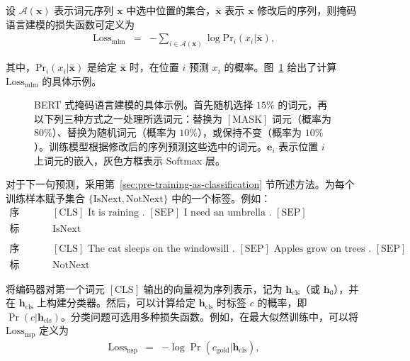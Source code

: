 设 $\mathcal{A}(\mathbf{x})$ 表示词元序列 $\mathbf{x}$ 中选中位置的集合，$\bar{\mathbf{x}}$ 表示 $\mathbf{x}$ 修改后的序列，则掩码语言建模的损失函数可定义为
\begin{eqnarray}
\mathrm{Loss}_{\mathrm{mlm}} & = & - \sum_{i \in \mathcal{A}(\mathbf{x})} \log \mathrm{Pr}_i(x_i|\bar{\mathbf{x}}),
\end{eqnarray}

\noindent 其中，$\mathrm{Pr}_i(x_i|\bar{\mathbf{x}})$ 是给定 $\bar{\mathbf{x}}$ 时，在位置 $i$ 预测 $x_i$ 的概率。图~\ref{fig:example-bert-mlm-loss} 给出了计算 $\mathrm{Loss}_{\mathrm{mlm}}$ 的具体示例。

\begin{figure}[!t]
\centering

\caption{BERT 式掩码语言建模的具体示例。首先随机选择 $15\%$ 的词元，再以下列三种方式之一处理所选词元：替换为 $\mathrm{[MASK]}$ 词元（概率为 $80\%$）、替换为随机词元（概率为 $10\%$），或保持不变（概率为 $10\%$）。训练模型根据修改后的序列预测这些选中的词元。$\mathbf{e}_i$ 表示位置 $i$ 上词元的嵌入，灰色方框表示 Softmax 层。}
\label{fig:example-bert-mlm-loss}
\end{figure}

对于下一句预测，采用第~\ref{sec:pre-training-as-classification} 节所述方法。为每个训练样本赋予集合 $\{\mathrm{IsNext}, \mathrm{NotNext}\}$ 中的一个标签。例如：
\begin{eqnarray}
\textrm{序列：} & & \textrm{$[\mathrm{CLS}]$ It is raining . $[\mathrm{SEP}]$ I need an umbrella . $[\mathrm{SEP}]$} \nonumber \\
\textrm{标签：} & & \textrm{$\mathrm{IsNext}$} \nonumber \\
& & \nonumber \\
\textrm{序列：} & & \textrm{$[\mathrm{CLS}]$ The cat sleeps on the windowsill . $[\mathrm{SEP}]$ Apples grow on trees . $[\mathrm{SEP}]$} \nonumber \\
\textrm{标签：} & & \textrm{$\mathrm{NotNext}$} \nonumber
\end{eqnarray}

\noindent 将编码器对第一个词元 $\mathrm{[CLS]}$ 输出的向量视为序列表示，记为 $\mathbf{h}_{\mathrm{cls}}$（或 $\mathbf{h}_0$），并在 $\mathbf{h}_{\mathrm{cls}}$ 上构建分类器。然后，可以计算给定 $\mathbf{h}_{\mathrm{cls}}$ 时标签 $c$ 的概率，即 $\Pr(c|\mathbf{h}_{\mathrm{cls}})$。分类问题可选用多种损失函数。例如，在最大似然训练中，可以将 $\mathrm{Loss}_{\mathrm{nsp}}$ 定义为
\begin{eqnarray}
\mathrm{Loss}_{\mathrm{nsp}} & = & -\log \Pr(c_{\mathrm{gold}}|\mathbf{h}_{\mathrm{cls}}),
\end{eqnarray}

